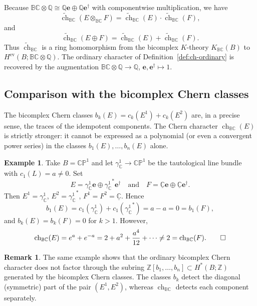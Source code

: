 \documentclass[11pt]{amsart}
\newcommand{\BC}{\mathbb{BC}}       %
\newcommand{\C}{\mathbb{C}}          %
\renewcommand{\P}{\mathbb{P}}
\newcommand{\e}{\mathbf{e}}          %
\newcommand{\ed}{\mathbf{e}^\dagger} %
\theoremstyle{definition}
\newtheorem{remark}[prop]{Remark}            %
\newtheorem{example}[prop]{Example}       %
\begin{document}
Because $\BC\otimes\mathbb Q\cong\mathbb Q\e\oplus\mathbb Q\ed$ with componentwise multiplication, we have
\begin{equation*}
\widetilde{\operatorname{ch}}_{\BC}(E\otimes_{\BC}F)
=\widetilde{\operatorname{ch}}_{\BC}(E)\cdot\widetilde{\operatorname{ch}}_{\BC}(F),
\end{equation*}
and
\begin{equation*}
\widetilde{\operatorname{ch}}_{\BC}(E\oplus F)
=\widetilde{\operatorname{ch}}_{\BC}(E)+\widetilde{\operatorname{ch}}_{\BC}(F).
\end{equation*}
Thus $\widetilde{\operatorname{ch}}_{\BC}$ is a ring homomorphism from the bicomplex $K$-theory $K_{\BC}(B)$ to $H^{\mathrm{ev}}(B;\BC\otimes\mathbb Q)$.  The ordinary character of Definition~\ref{def:ch-ordinary} is recovered by the augmentation $\BC\otimes\mathbb Q\to\mathbb Q$, $\e,\ed\mapsto 1$.

\subsection{Comparison with the bicomplex Chern classes}

The bicomplex Chern classes $b_{k}(E)=c_{k}(E^1)+c_{k}(E^2)$ are, in a precise sense, the traces of the idempotent components.  The Chern character $\operatorname{ch}_{\BC}(E)$ is strictly stronger: it cannot be expressed as a polynomial (or even a convergent power series) in the classes $b_{1}(E),\dots,b_{n}(E)$ alone.

\begin{example}
Take $B=\C\P^{1}$ and let $\gamma_\C^1\to\C\P^{1}$ be the tautological line bundle with $c_{1}(L)=a\neq 0$.  Set
\begin{equation*}
E=\gamma_\C^1\e\oplus {\gamma_\C^1}^{*}\ed\quad \text{and}\quad
F=\underline{\C}\e\oplus\underline{\C}\ed.
\end{equation*}
Then $E^1=\gamma_\C^1$, $E^2={\gamma_\C^1}^{*}$, $F^1=F^2=\underline{\mathbb C}$.  Hence
\begin{equation*}
b_{1}(E)=c_{1}(\gamma_\C^1)+c_{1}({\gamma_\C^1}^{*})=a-a=0=b_{1}(F),
\end{equation*}
and $b_{k}(E)=b_{k}(F)=0$ for $k>1$.  However,
\begin{equation*}
\operatorname{ch}_{\BC}(E)=e^{a}+e^{-a}=2+a^{2}+\frac{a^{4}}{12}+\cdots\neq 2=\operatorname{ch}_{\BC}(F).
\qedhere
\end{equation*}
\end{example}

\begin{remark}
The same example shows that the ordinary bicomplex Chern character does not factor through the subring $\mathbb Z[b_{1},\dots,b_{n}]\subset H^{*}(B;\mathbb Z)$ generated by the bicomplex Chern classes.  The classes $b_{k}$ detect the diagonal (symmetric) part of the pair $(E^1,E^2)$, whereas $\operatorname{ch}_{\BC}$ detects each component separately.
\end{remark}
\end{document}
